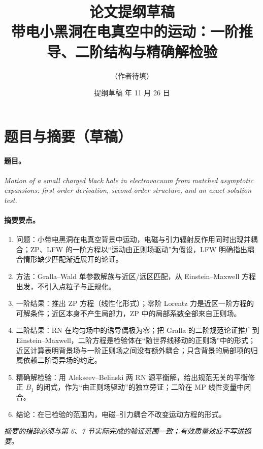 \documentclass[11pt,a4paper]{ctexart}
\title{论文提纲草稿\\[4pt]\large 带电小黑洞在电真空中的运动：一阶推导、二阶结构与精确解检验}
\author{（作者待填）}
\date{提纲草稿 \quad 2026 年 11 月 26 日}
\begin{document}
\maketitle

\begin{center}
\end{center}

\tableofcontents

\section*{题目与摘要（草稿）}

\paragraph{题目。}\emph{Motion of a small charged black hole in electrovacuum from matched asymptotic expansions: first-order derivation, second-order structure, and an exact-solution test.}

\paragraph{摘要要点。}
\begin{enumerate}[nosep]
\item 问题：小带电黑洞在电真空背景中运动，电磁与引力辐射反作用同时出现并耦合；ZP、LFW 的一阶方程以“运动由正则场驱动”为假设，LFW 明确指出耦合情形缺少匹配渐近展开的论证。
\item 方法：Gralla--Wald 单参数解族与近区/远区匹配，从 Einstein--Maxwell 方程出发，不引入点粒子与正规化。
\item 一阶结果：推出 ZP 方程（线性化形式）；零阶 Lorentz 力是近区一阶方程的可解条件；近区本身不产生局部力，ZP 中的局部系数全部来自正则场。
\item 二阶结果：RN 在均匀场中的诱导偶极为零；把 Gralla 的二阶规范论证推广到 Einstein--Maxwell，二阶方程是检验体在“随世界线移动的正则场”中的形式；近区计算表明背景场与一阶正则场之间没有额外耦合；只含背景的局部项的归属依赖二阶奇异场的约定。
\item 精确解检验：用 Alekseev--Belinski 两 RN 源平衡解，给出规范无关的平衡修正 $B_1$ 的闭式，作为“由正则场驱动”的独立旁证；二阶在 MP 线性变量中闭合。
\item 结论：在已检验的范围内，电磁--引力耦合不改变运动方程的形式。
\end{enumerate}
\emph{摘要的措辞必须与第 6、7 节实际完成的验证范围一致；有效质量效应不写进摘要。}
\end{document}
